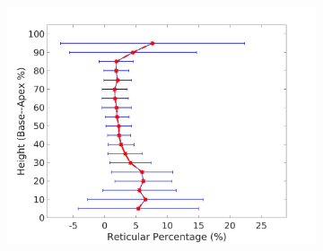 \begin{figure}[H]
\begin{subfigure}{.4\linewidth}
  \includegraphics[width=\linewidth,trim={{.0\wd0} {.0\wd0} {.0\wd0} {.0\wd0}},clip]{QuantitativeAnalysis/Image/LeftLungReticularDiseaseAgainstHeight.jpg} %
  \caption{}
  \label{fig:DiseaseAgainstHeight-c} 
\end{subfigure} 
\begin{subfigure}{.4\linewidth}%

\end{subfigure}
\end{figure}
